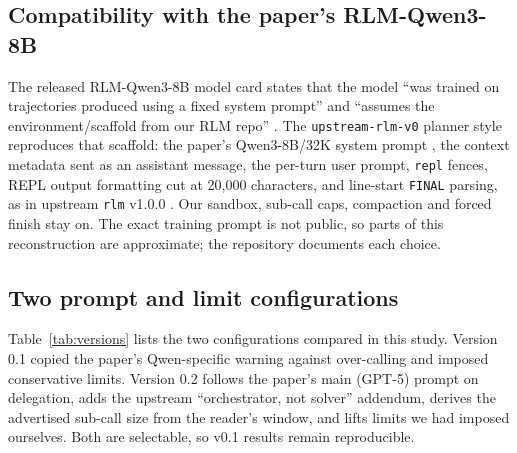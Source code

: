 \documentclass[11pt]{article}
\newcommand{\code}[1]{\texttt{#1}}
\begin{document}
\subsection{Compatibility with the paper's RLM-Qwen3-8B}
The released RLM-Qwen3-8B model card states that the model ``was trained on
trajectories produced using a fixed system prompt'' and ``assumes the
environment/scaffold from our RLM repo'' \citep{rlmqwen8b}. The
\code{upstream-rlm-v0} planner style reproduces that scaffold: the paper's
Qwen3-8B/32K system prompt \citep[App.~C.1]{zhang2025rlm}, the context metadata
sent as an assistant message, the per-turn user prompt, \code{repl} fences, REPL
output formatting cut at 20,000 characters, and line-start \code{FINAL} parsing, as
in upstream \code{rlm} v1.0.0 \citep{rlmrepo}. Our sandbox, sub-call caps,
compaction and forced finish stay on. The exact training prompt is not public, so
parts of this reconstruction are approximate; the repository documents each
choice.

\subsection{Two prompt and limit configurations}
\label{sec:versions}
Table~\ref{tab:versions} lists the two configurations compared in this study.
Version 0.1 copied the paper's Qwen-specific warning against over-calling and
imposed conservative limits. Version 0.2 follows the paper's main (GPT-5) prompt
on delegation, adds the upstream ``orchestrator, not solver'' addendum, derives the
advertised sub-call size from the reader's window, and lifts limits we had imposed
ourselves. Both are selectable, so v0.1 results remain reproducible.
\end{document}
